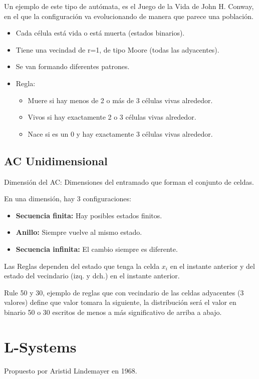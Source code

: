 Un ejemplo de este tipo de autómata, es el Juego de la Vida de John H. Conway, en el que la configuración va evolucionando de manera que parece una población.
\begin{itemize}
    \item Cada célula está vida o está muerta (estados binarios).
    \item Tiene una vecindad de r=1, de tipo Moore (todas las adyacentes).
    \item Se van formando diferentes patrones.
    \item Regla: 
    \begin{itemize}
        \item Muere si hay menos de 2 o más de 3 células vivas alrededor.
        \item Vivos si hay exactamente 2 o 3 células vivas alrededor.
        \item Nace si es un 0 y hay exactamente 3 células vivas alrededor.
    \end{itemize}   
\end{itemize}

\subsection{AC Unidimensional}
Dimensión del AC: Dimensiones del entramado que forman el conjunto de celdas.

En una dimensión, hay 3 configuraciones:
\begin{itemize}
    \item \textbf{Secuencia finita:} Hay posibles estados finitos.
    \item \textbf{Anillo:} Siempre vuelve al mismo estado.
    \item \textbf{Secuencia infinita:} El cambio siempre es diferente.
\end{itemize}

Las Reglas dependen del estado que tenga la celda $x_i$ en el instante anterior y del estado del vecindario (izq. y dch.) en el instante anterior.

Rule 50 y 30, ejemplo de reglas que con vecindario de las celdas adyacentes (3 valores) define que valor tomara la siguiente, la distribución será el valor en binario 50 o 30 escritos de menos a más significativo de arriba a abajo.

\section{L-Systems}
Propuesto por Aristid Lindemayer en 1968.

